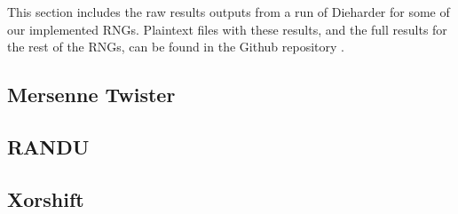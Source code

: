 This section includes the raw results outputs from a run of Dieharder for some of our implemented RNGs. Plaintext files with these results, and the full results for the rest of the RNGs, can be found in the Github repository \cite{github_repo}.

\subsection{Mersenne Twister}
\label{sec:res_mt}


\subsection{RANDU}
\label{sec:res_randu}


\subsection{Xorshift}
\label{sec:res_xorshift}

